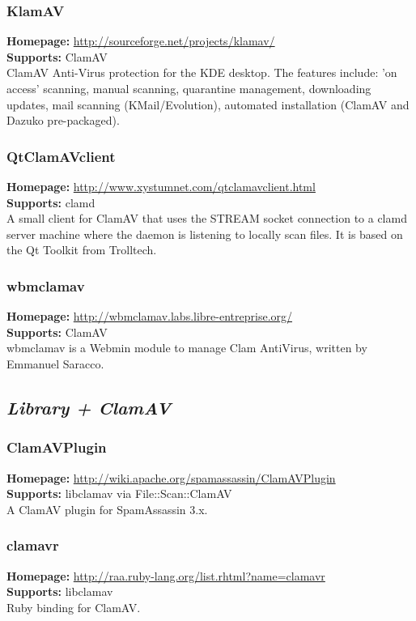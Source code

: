 \documentclass[a4paper,titlepage,12pt]{article}
\begin{document}
    \subsubsection{KlamAV}
    \textbf{Homepage:} \url{http://sourceforge.net/projects/klamav/}\\
    \textbf{Supports:} ClamAV\\[4pt]
    ClamAV Anti-Virus protection for the KDE desktop. The features include:
    'on access' scanning, manual scanning, quarantine management, downloading
    updates, mail scanning (KMail/Evolution), automated installation (ClamAV
    and Dazuko pre-packaged).

    \subsubsection{QtClamAVclient}
    \textbf{Homepage:} \url{http://www.xystumnet.com/qtclamavclient.html}\\
    \textbf{Supports:} clamd\\[4pt]
    A small client for ClamAV that uses the STREAM socket connection to a
    clamd server machine where the daemon is listening to locally scan files.
    It is based on the Qt Toolkit from Trolltech.

    \subsubsection{wbmclamav}
    \textbf{Homepage:} \url{http://wbmclamav.labs.libre-entreprise.org/}\\
    \textbf{Supports:} ClamAV\\[4pt]
    wbmclamav is a Webmin module to manage Clam AntiVirus, written by
    Emmanuel Saracco. 

    \subsection{\emph{Library + ClamAV}}

    \subsubsection{ClamAVPlugin}
    \textbf{Homepage:} \url{http://wiki.apache.org/spamassassin/ClamAVPlugin}\\
    \textbf{Supports:} libclamav via File::Scan::ClamAV\\[4pt]
    A ClamAV plugin for SpamAssassin 3.x.

    \subsubsection{clamavr}
    \textbf{Homepage:} \url{http://raa.ruby-lang.org/list.rhtml?name=clamavr}\\
    \textbf{Supports:} libclamav\\[4pt]
    Ruby binding for ClamAV.
\end{document}
